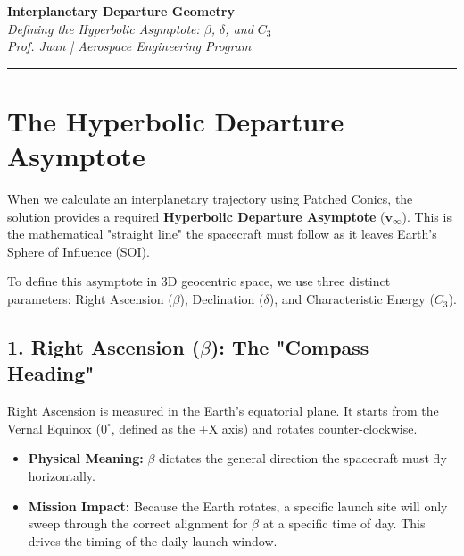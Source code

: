 \documentclass[11pt, letterpaper]{article}
\begin{document}
\begin{center}
    {\Large \textbf{Interplanetary Departure Geometry}} \\
    \vspace{0.2cm}
    {\large \textit{Defining the Hyperbolic Asymptote: $\beta$, $\delta$, and $C_3$}} \\
    \vspace{0.4cm}
    \textit{Prof. Juan | Aerospace Engineering Program}
\end{center}

\hrule
\vspace{0.5cm}

\section*{The Hyperbolic Departure Asymptote}
When we calculate an interplanetary trajectory using Patched Conics, the solution provides a required \textbf{Hyperbolic Departure Asymptote} ($\boldsymbol{v}_\infty$). This is the mathematical "straight line" the spacecraft must follow as it leaves Earth's Sphere of Influence (SOI). 

To define this asymptote in 3D geocentric space, we use three distinct parameters: Right Ascension ($\beta$), Declination ($\delta$), and Characteristic Energy ($C_3$).

\subsection*{1. Right Ascension ($\beta$): The "Compass Heading"}
Right Ascension is measured in the Earth's equatorial plane. It starts from the Vernal Equinox ($0^\circ$, defined as the +X axis) and rotates counter-clockwise.
\begin{itemize}
    \item \textbf{Physical Meaning:} $\beta$ dictates the general direction the spacecraft must fly horizontally. 
    \item \textbf{Mission Impact:} Because the Earth rotates, a specific launch site will only sweep through the correct alignment for $\beta$ at a specific time of day. This drives the timing of the daily launch window.
\end{itemize}
\end{document}
